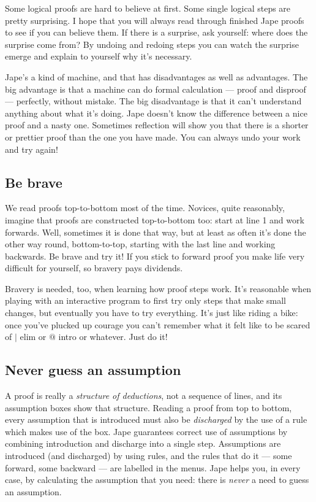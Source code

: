 \documentclass[11pt]{book}
\begin{document}
Some logical proofs are hard to believe at first. Some single logical steps are pretty surprising. I hope that you will always read through finished Jape proofs to see if you can believe them. If there is a surprise, ask yourself: where does the surprise come from? By undoing and redoing steps you can watch the surprise emerge and explain to yourself why it's necessary.

Jape's a kind of machine, and that has disadvantages as well as advantages. The big advantage is that a machine can do formal calculation --- proof and disproof --- perfectly, without mistake. The big disadvantage is that it can't understand anything about what it's doing. Jape doesn't know the difference between a nice proof and a nasty one. Sometimes reflection will show you that there is a shorter or prettier proof than the one you have made. You can always undo your work and try again!

\subsection{Be brave}

We read proofs top-to-bottom most of the time. Novices, quite reasonably, imagine that proofs are constructed top-to-bottom too: start at line 1 and work forwards. Well, sometimes it is done that way, but at least as often it's done the other way round, bottom-to-top, starting with the last line and working backwards. Be brave and try it! If you stick to forward proof you make life very difficult for yourself, so bravery pays dividends.

Bravery is needed, too, when learning how proof steps work. It's reasonable when playing with an interactive program to first try only steps that make small changes, but eventually you have to try everything. It's just like riding a bike: once you've plucked up courage you can't remember what it felt like to be scared of $|$ elim or $@$ intro or whatever. Just do it!  

\subsection{Never guess an assumption}

A proof is really a \emph{structure of deductions}, not a sequence of lines, and its assumption boxes show that structure. Reading a proof from top to bottom, every assumption that is introduced must also be \emph{discharged} by the use of a rule which makes use of the box. Jape guarantees correct use of assumptions by combining introduction and discharge into a single step. Assumptions are introduced (and discharged) by using rules, and the rules that do it --- some forward, some backward --- are labelled in the menus. Jape helps you, in every case, by calculating the assumption that you need: there is \emph{never} a need to guess an assumption.
\end{document}
